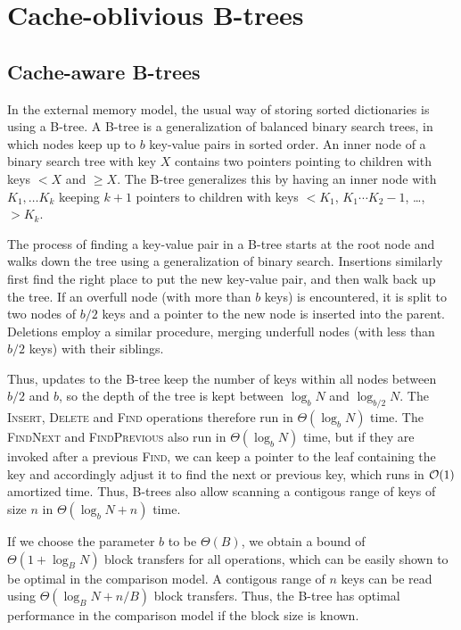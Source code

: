 \chapter{Cache-oblivious B-trees}

\section{Cache-aware B-trees}
In the external memory model, the usual way of storing sorted dictionaries
is using a B-tree. A B-tree is a generalization of balanced binary search
trees, in which nodes keep up to $b$ key-value pairs in sorted order.
An inner node of a binary search tree with key $X$ contains two pointers
pointing to children with keys $< X$ and $\geq X$. The B-tree generalizes
this by having an inner node with $K_1,\ldots K_k$ keeping $k+1$ pointers
to children with keys $< K_1$, $K_1\cdots K_2-1$, \dots, $> K_k$.

The process of finding a key-value pair in a B-tree starts at the root node
and walks down the tree using a generalization of binary search. Insertions
similarly first find the right place to put the new key-value pair, and
then walk back up the tree. If an overfull node (with more than $b$ keys)
is encountered, it is split to two nodes of $b/2$ keys and a pointer to
the new node is inserted into the parent. Deletions employ a similar procedure,
merging underfull nodes (with less than $b/2$ keys) with their siblings.

Thus, updates to the B-tree keep the number of keys within all nodes between
$b/2$ and $b$, so the depth of the tree is kept between $\log_b N$ and
$\log_{b/2} N$. The \textsc{Insert}, \textsc{Delete} and
\textsc{Find} operations therefore run in $\Theta(\log_b N)$ time.
The \textsc{FindNext} and \textsc{FindPrevious} also run in $\Theta(\log_b N)$ time,
but if they are invoked after a previous \textsc{Find}, we can keep a pointer
to the leaf containing the key and accordingly adjust it to find the next
or previous key, which runs in $\mathcal{O}(1)$ amortized time.
Thus, B-trees also allow scanning a contigous range of keys of size $n$
in $\Theta(\log_b N + n)$ time.

If we choose the parameter $b$ to be $\Theta(B)$, we obtain a bound of
$\Theta(1+\log_B N)$ block transfers for all operations, which can
be easily shown to be optimal in the comparison model.
A contigous range of $n$ keys can be
read using $\Theta(\log_B N+n/B)$ block transfers.
Thus, the B-tree has optimal performance in the comparison model
if the block size is known.

